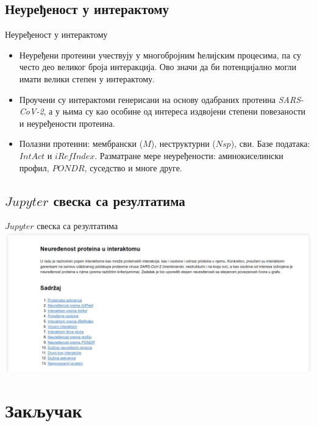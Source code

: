 \documentclass[hyperref={bookmarks=false}]{beamer}
\begin{document}
\subsection{Неуређеност у интерактому}
\begin{frame}{Неуређеност у интерактому}
\begin{itemize}
	\item Неуређени протеини учествују у многобројним ћелијским процесима, па су често део великог броја интеракција. Ово значи да би потенцијално могли имати велики степен у интерактому.

	\item Проучени су интерактоми генерисани на основу одабраних протеина \textit{SARS-CoV-2}, а у њима су као особине од интереса издвојени степени повезаности и неуређености протеина.

	\item Полазни протеини: мембрански ($M$), неструктурни ($Nsp$), сви. Базе података: $IntAct$ и $iRefIndex$. Разматране мере неуређености: аминокиселински профил, $PONDR$, суседство и многе друге.
\end{itemize}
\end{frame}

\subsection{$Jupyter$ свеска са резултатима}
\begin{frame}{$Jupyter$ свеска са резултатима}
\centering\includegraphics[width=\textwidth]{sveska.png}
\end{frame}


\section{Закључак}
\end{document}
